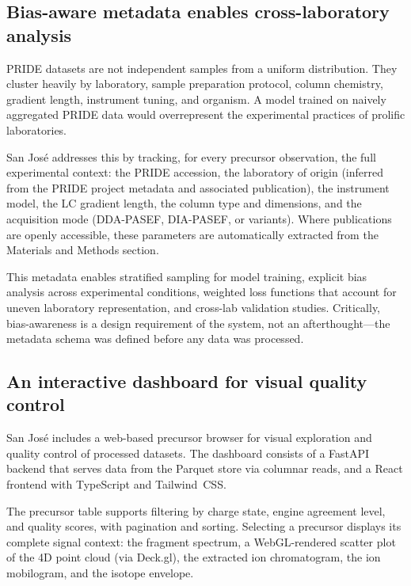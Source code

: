 \documentclass[10pt,twoside]{article}
\begin{document}

\subsection*{Bias-aware metadata enables cross-laboratory analysis}

PRIDE datasets are not independent samples from a uniform distribution.
They cluster heavily by laboratory, sample preparation protocol, column chemistry, gradient length, instrument tuning, and organism.
A model trained on naively aggregated PRIDE data would overrepresent the experimental practices of prolific laboratories.

San Jos\'{e} addresses this by tracking, for every precursor observation, the full experimental context: the PRIDE accession, the laboratory of origin (inferred from the PRIDE project metadata and associated publication), the instrument model, the LC gradient length, the column type and dimensions, and the acquisition mode (DDA-PASEF, DIA-PASEF, or variants).
Where publications are openly accessible, these parameters are automatically extracted from the Materials and Methods section.

This metadata enables stratified sampling for model training, explicit bias analysis across experimental conditions, weighted loss functions that account for uneven laboratory representation, and cross-lab validation studies.
Critically, bias-awareness is a design requirement of the system, not an afterthought---the metadata schema was defined before any data was processed.


\subsection*{An interactive dashboard for visual quality control}

San Jos\'{e} includes a web-based precursor browser for visual exploration and quality control of processed datasets.
The dashboard consists of a FastAPI backend that serves data from the Parquet store via columnar reads, and a React frontend with TypeScript and Tailwind~CSS.

The precursor table supports filtering by charge state, engine agreement level, and quality scores, with pagination and sorting.
Selecting a precursor displays its complete signal context: the fragment spectrum, a WebGL-rendered scatter plot of the 4D point cloud (via Deck.gl), the extracted ion chromatogram, the ion mobilogram, and the isotope envelope.
\end{document}
